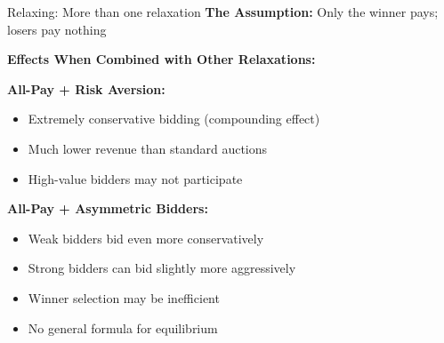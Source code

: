 \documentclass[xcolor={x11names}]{beamer}
\begin{document}
\begin{frame}{Relaxing: More than one relaxation}
\textbf{The Assumption:} Only the winner pays; losers pay nothing

\textbf{Effects When Combined with Other Relaxations:}

\textbf{All-Pay + Risk Aversion:}
\begin{itemize}
  \item Extremely conservative bidding (compounding effect)
  \item Much lower revenue than standard auctions
  \item High-value bidders may not participate
\end{itemize}

\vspace{0.2cm}
\textbf{All-Pay + Asymmetric Bidders:}
\begin{itemize}
  \item Weak bidders bid even more conservatively
  \item Strong bidders can bid slightly more aggressively
  \item Winner selection may be inefficient
  \item No general formula for equilibrium
\end{itemize}
\end{frame}
\end{document}
